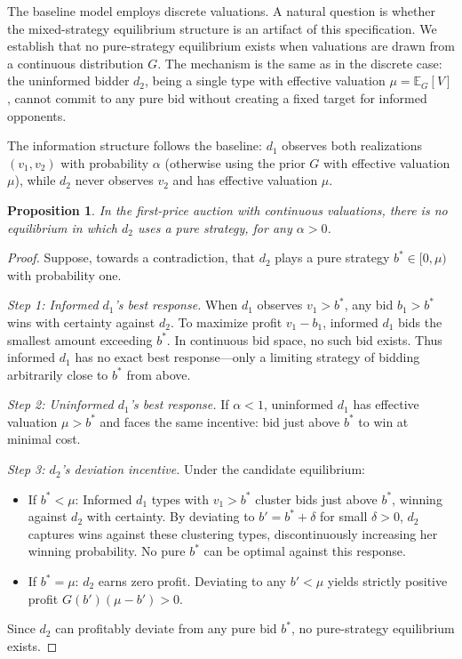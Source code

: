 \documentclass[11pt]{article}
\theoremstyle{plain}
\theoremstyle{definition}
\theoremstyle{plain}
\theoremstyle{plain}
\theoremstyle{plain}
\theoremstyle{plain}
\newtheorem{prop}[thm]{Proposition}
\numberwithin{equation}{section}
\begin{document}
The baseline model employs discrete valuations. A natural question is whether the mixed-strategy equilibrium structure is an artifact of this specification. We establish that no pure-strategy equilibrium exists when valuations are drawn from a continuous distribution $G$. The mechanism is the same as in the discrete case: the uninformed bidder $d_2$, being a single type with effective valuation $\mu = \mathbb{E}_G[V]$, cannot commit to any pure bid without creating a fixed target for informed opponents.

\noindent The information structure follows the baseline: $d_1$ observes both realizations $(v_1, v_2)$ with probability $\alpha$ (otherwise using the prior $G$ with effective valuation $\mu$), while $d_2$ never observes $v_2$ and has effective valuation $\mu$.

\begin{prop}
In the first-price auction with continuous valuations, there is no equilibrium in which $d_2$ uses a pure strategy, for any $\alpha > 0$.
\end{prop}

\begin{proof}
Suppose, towards a contradiction, that $d_2$ plays a pure strategy $b^* \in [0, \mu)$ with probability one.

\medskip
\noindent\textit{Step 1: Informed $d_1$'s best response.} When $d_1$ observes $v_1 > b^*$, any bid $b_1 > b^*$ wins with certainty against $d_2$. To maximize profit $v_1 - b_1$, informed $d_1$ bids the smallest amount exceeding $b^*$. In continuous bid space, no such bid exists. Thus informed $d_1$ has no exact best response—only a limiting strategy of bidding arbitrarily close to $b^*$ from above.

\medskip
\noindent\textit{Step 2: Uninformed $d_1$'s best response.} If $\alpha < 1$, uninformed $d_1$ has effective valuation $\mu > b^*$ and faces the same incentive: bid just above $b^*$ to win at minimal cost.

\medskip
\noindent\textit{Step 3: $d_2$'s deviation incentive.} Under the candidate equilibrium:
\begin{itemize}
    \item If $b^* < \mu$: Informed $d_1$ types with $v_1 > b^*$ cluster bids just above $b^*$, winning against $d_2$ with certainty. By deviating to $b' = b^* + \delta$ for small $\delta > 0$, $d_2$ captures wins against these clustering types, discontinuously increasing her winning probability. No pure $b^*$ can be optimal against this response.
    \item If $b^* = \mu$: $d_2$ earns zero profit. Deviating to any $b' < \mu$ yields strictly positive profit $G(b')(\mu - b') > 0$.
\end{itemize}
Since $d_2$ can profitably deviate from any pure bid $b^*$, no pure-strategy equilibrium exists.
\end{proof}
\end{document}

